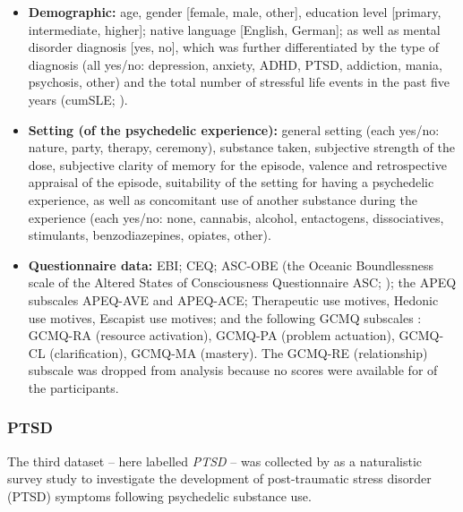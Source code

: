 \documentclass[man,floatsintext]{apa7}
\newcommand{\change}[1]{#1}
\begin{document}
\begin{itemize}

    \item \textbf{Demographic:} age, gender [female, male, other], education level [primary, intermediate, higher]; native language [English, German]; as well as mental disorder diagnosis [yes, no], which was further differentiated by the type of diagnosis (all yes/no: depression, anxiety, ADHD, PTSD, addiction, mania, psychosis, other) and the total number of stressful life events in the past five years (cumSLE; \cite{seery2010whatever}).  

    
    \item \textbf{Setting (of the psychedelic experience):} general setting (each yes/no: nature, party, therapy, ceremony), substance taken, subjective strength of the dose,  subjective clarity of memory for the episode, valence and retrospective appraisal of the episode, suitability of the setting for having a psychedelic experience, as well as concomitant use of another substance during the experience (each yes/no: \change{none,} cannabis, alcohol, entactogens, dissociatives, stimulants, benzodiazepines, opiates, other). 

    
    \item \textbf{Questionnaire data:} EBI; CEQ; ASC-OBE (the Oceanic Boundlessness scale of the Altered States of Consciousness Questionnaire ASC; \cite{dittrich1998standardized,studerus2010psychometric}); the \change{APEQ subscales
    APEQ-AVE and APEQ-ACE;} Therapeutic use motives, Hedonic use motives, Escapist use motives; and  the following GCMQ subscales \parencite{wolff2024measuring}: GCMQ-RA (resource activation), GCMQ-PA (problem actuation), GCMQ-CL (clarification), GCMQ-MA (mastery). The GCMQ-RE (relationship) subscale was dropped from analysis because no scores were available for  of the  participants.
    
\end{itemize}

\subsubsection{PTSD}

The third dataset -- here labelled \emph{PTSD} -- was collected by \textcite{evens2026post} as a naturalistic survey study to investigate the development of post-traumatic stress disorder (PTSD) symptoms following psychedelic substance use. 
\end{document}
